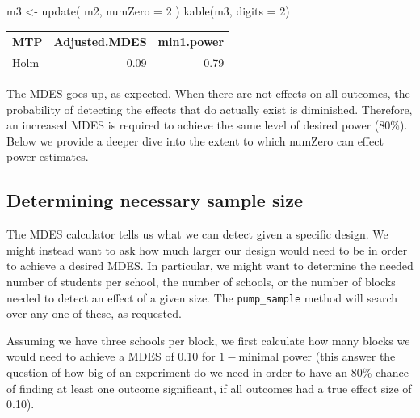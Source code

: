 \documentclass[
]{article}
\newenvironment{Shaded}{\begin{snugshade}}{\end{snugshade}}
\newcommand{\AttributeTok}[1]{\textcolor[rgb]{0.77,0.63,0.00}{#1}}
\newcommand{\DecValTok}[1]{\textcolor[rgb]{0.00,0.00,0.81}{#1}}
\newcommand{\FunctionTok}[1]{\textcolor[rgb]{0.00,0.00,0.00}{#1}}
\newcommand{\NormalTok}[1]{#1}
\newcommand{\OtherTok}[1]{\textcolor[rgb]{0.56,0.35,0.01}{#1}}
\begin{document}
\begin{Shaded}
\begin{Highlighting}[]
\NormalTok{m3 }\OtherTok{\textless{}{-}} \FunctionTok{update}\NormalTok{( m2, }\AttributeTok{numZero =} \DecValTok{2}\NormalTok{ )}
\FunctionTok{kable}\NormalTok{(m3, }\AttributeTok{digits =} \DecValTok{2}\NormalTok{)}
\end{Highlighting}
\end{Shaded}

\begin{tabular}{l|r|r}
\hline
MTP & Adjusted.MDES & min1.power\\
\hline
Holm & 0.09 & 0.79\\
\hline
\end{tabular}

The MDES goes up, as expected. When there are not effects on all
outcomes, the probability of detecting the effects that do actually
exist is diminished. Therefore, an increased MDES is required to achieve
the same level of desired power (80\%). Below we provide a deeper dive
into the extent to which numZero can effect power estimates.

\subsection{Determining necessary sample size}

The MDES calculator tells us what we can detect given a specific design.
We might instead want to ask how much larger our design would need to be
in order to achieve a desired MDES. In particular, we might want to
determine the needed number of students per school, the number of
schools, or the number of blocks needed to detect an effect of a given
size. The \texttt{pump\_sample} method will search over any one of
these, as requested.

Assuming we have three schools per block, we first calculate how many
blocks we would need to achieve a MDES of 0.10 for \(1-\)minimal power
(this answer the question of how big of an experiment do we need in
order to have an 80\% chance of finding at least one outcome
significant, if all outcomes had a true effect size of 0.10).
\end{document}
